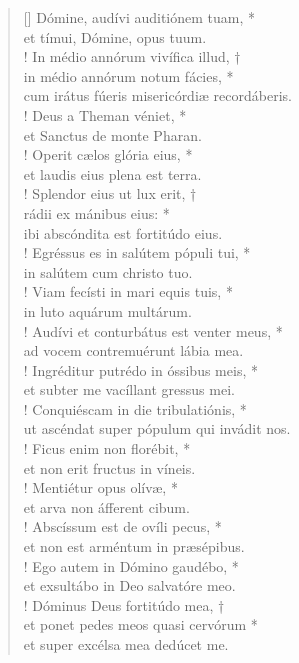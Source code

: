 \begin{verse}[\versewidth]
Dómine, audívi auditiónem tuam, *\\
et tímui, Dómine, opus tuum.\\!
\vin In médio annórum vivífica illud, †\\
\vin in médio annórum notum fácies, *\\
\vin cum irátus fúeris misericórdiæ recordáberis.\\!
Deus a Theman véniet, *\\
et Sanctus de monte Pharan.\\!
\vin Operit cælos glória eius, *\\
\vin et laudis eius plena est terra.\\!
Splendor eius ut lux erit, †\\
rádii ex mánibus eius: *\\
ibi abscóndita est fortitúdo eius.\\!
\vin Egréssus es in salútem pópuli tui, *\\
\vin in salútem cum christo tuo.\\!
Viam fecísti in mari equis tuis, *\\
in luto aquárum multárum.\\!
\vin Audívi et conturbátus est venter meus, *\\
\vin ad vocem contremuérunt lábia mea.\\!
Ingréditur putrédo in óssibus meis, *\\
et subter me vacíllant gressus mei.\\!
\vin Conquiéscam in die tribulatiónis, *\\
\vin ut ascéndat super pópulum qui invádit nos.\\!
Ficus enim non florébit, *\\
et non erit fructus in víneis.\\!
\vin Mentiétur opus olívæ, *\\
\vin et arva non áfferent cibum.\\!
Abscíssum est de ovíli pecus, *\\
et non est arméntum in præsépibus.\\!
\vin Ego autem in Dómino gaudébo, *\\
\vin et exsultábo in Deo salvatóre meo.\\!
Dóminus Deus fortitúdo mea, †\\
et ponet pedes meos quasi cervórum *\\
et super excélsa mea dedúcet me.\\
\end{verse}
\vspace{1cm}


